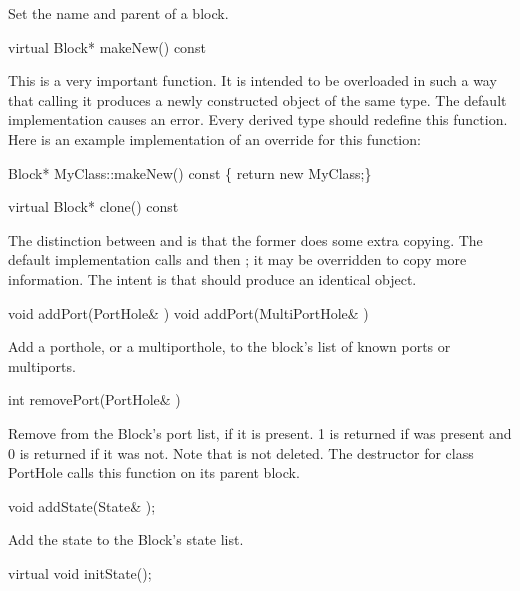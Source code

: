 Set the name and parent of a block.

\begin{example}
virtual Block* makeNew() const
\end{example}

This is a very important function.  It is intended to be overloaded in
such a way that calling it produces a newly constructed object of the
same type.  The default implementation causes an error.  Every derived
type should redefine this function.  Here is an example implementation
of an override for this function:

\begin{example}
Block* MyClass::makeNew() const \{ return new MyClass;\}
\end{example}

\begin{example}
virtual Block* clone() const
\end{example}

The distinction between  and  is that the
former does some extra copying.  The default implementation calls
 and then ; it may be overridden to
copy more information.  The intent is that  should produce
an identical object.

\begin{example}
void addPort(PortHole& )
void addPort(MultiPortHole& )
\end{example}

Add a porthole, or a multiporthole, to the block's list of known ports
or multiports.

\begin{example}
int removePort(PortHole& )
\end{example}

Remove  from the Block's port list, if it is present.
1 is returned if  was present and 0 is returned if it
was not.  Note that  is not deleted.  The destructor
for class PortHole calls this function on its parent block.

\begin{example}
void addState(State& );
\end{example}

Add the state  to the Block's state list.

\begin{example}
virtual void initState();
\end{example}

